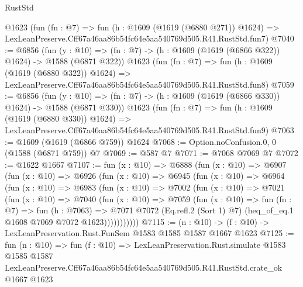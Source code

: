 \begin{lexlean}{RustStd}
\begin{coremodule}
    @1623
    (fun (fn : @7) =>
    fun (h : @1609 (@1619 (@6880 @271)) @1624) =>
    LexLeanPreserve.Cff67a46aa86b54fc64e5aa540769d505.R41.RustStd.fun7)
@7040 := @6856
    (fun (y : @10) => (fn : @7) -> (h : @1609 (@1619 (@6866 @322)) @1624) -> @1588 (@6871 @322))
    @1623
    (fun (fn : @7) =>
    fun (h : @1609 (@1619 (@6880 @322)) @1624) =>
    LexLeanPreserve.Cff67a46aa86b54fc64e5aa540769d505.R41.RustStd.fun8)
@7059 := @6856
    (fun (y : @10) => (fn : @7) -> (h : @1609 (@1619 (@6866 @330)) @1624) -> @1588 (@6871 @330))
    @1623
    (fun (fn : @7) =>
    fun (h : @1609 (@1619 (@6880 @330)) @1624) =>
    LexLeanPreserve.Cff67a46aa86b54fc64e5aa540769d505.R41.RustStd.fun9)
@7063 := @1609 (@1619 (@6866 @759)) @1624
@7068 := Option.noConfusion.{0, 0} (@1588 (@6871 @759)) @7
@7069 := @587 @7
@7071 := @7068 @7069 @7
@7072 := @1622 @1667
@7107 := fun (x : @10) =>
  @6888
    (fun (x : @10) =>
    @6907
      (fun (x : @10) =>
      @6926
        (fun (x : @10) =>
        @6945
          (fun (x : @10) =>
          @6964
            (fun (x : @10) =>
            @6983
              (fun (x : @10) =>
              @7002
                (fun (x : @10) =>
                @7021
                  (fun (x : @10) =>
                  @7040
                    (fun (x : @10) =>
                    @7059
                      (fun (x : @10) =>
                      fun (fn : @7) =>
                      fun (h : @7063) =>
                      @7071
                        @7072
                        (Eq.refl.{2} (Sort 1) @7)
                        (heq_of_eq.{1} @1608 @7069 @7072 @1623)))))))))))
@7115 := (n : @10) -> (f : @10) -> LexLeanPreservation.Rust.FunSem @1583 @1585 @1587 @1667 @1623
@7125 := fun (n : @10) =>
  fun (f : @10) =>
  LexLeanPreservation.Rust.simulate
    @1583
    @1585
    @1587
    LexLeanPreserve.Cff67a46aa86b54fc64e5aa540769d505.R41.RustStd.crate_ok
    @1667
    @1623
\end{coremodule}
\end{lexlean}
